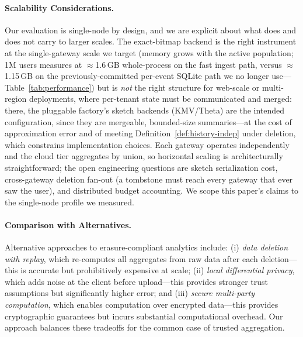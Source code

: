 \documentclass[sigconf,anonymous,review]{acmart}
\begin{document}
\paragraph{Scalability Considerations.} Our evaluation is single-node by design, and we are explicit about what does and does not carry to larger scales. The exact-bitmap backend is the right instrument at the single-gateway scale we target (memory grows with the active population; 1M users measures at $\approx$1.6\,GB whole-process on the fast ingest path, versus $\approx$1.15\,GB on the previously-committed per-event SQLite path we no longer use---Table~\ref{tab:performance}) but is \emph{not} the right structure for web-scale or multi-region deployments, where per-tenant state must be communicated and merged: there, the pluggable factory's sketch backends (KMV/Theta) are the intended configuration, since they are mergeable, bounded-size summaries---at the cost of approximation error and of meeting Definition~\ref{def:history-indep} under deletion, which constrains implementation choices. Each gateway operates independently and the cloud tier aggregates by union, so horizontal scaling is architecturally straightforward; the open engineering questions are sketch serialization cost, cross-gateway deletion fan-out (a tombstone must reach every gateway that ever saw the user), and distributed budget accounting. We scope this paper's claims to the single-node profile we measured.

\paragraph{Comparison with Alternatives.} Alternative approaches to erasure-compliant analytics include: (i) \emph{data deletion with replay}, which re-computes all aggregates from raw data after each deletion---this is accurate but prohibitively expensive at scale; (ii) \emph{local differential privacy}, which adds noise at the client before upload---this provides stronger trust assumptions but significantly higher error; and (iii) \emph{secure multi-party computation}, which enables computation over encrypted data---this provides cryptographic guarantees but incurs substantial computational overhead. Our approach balances these tradeoffs for the common case of trusted aggregation.
\end{document}
